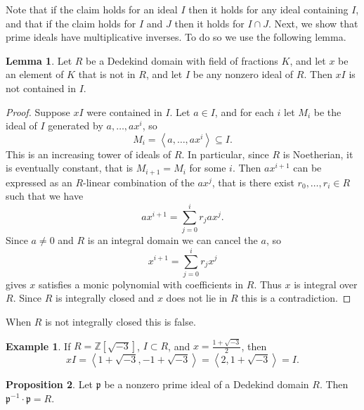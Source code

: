 \documentclass{article}
\newcommand{\Z}{\mathbb{Z}}
\renewcommand{\sb}[1]{\left[ #1 \right]}
\newcommand{\ab}[1]{\left\langle #1 \right\rangle}
\theoremstyle{definition}\newtheorem{definition}{Definition}[subsection]
\theoremstyle{definition}\newtheorem{remark}[definition]{Remark}
\theoremstyle{definition}\newtheorem*{example}{Example}
\theoremstyle{definition}\newtheorem*{note}{Note}
\newtheorem{proposition}[definition]{Proposition}
\newtheorem{lemma}[definition]{Lemma}
\begin{document}
Note that if the claim holds for an ideal $ I $ then it holds for any ideal containing $ I $, and that if the claim holds for $ I $ and $ J $ then it holds for $ I \cap J $. Next, we show that prime ideals have multiplicative inverses. To do so we use the following lemma.

\begin{lemma}
\label{lem:11.1.7}
Let $ R $ be a Dedekind domain with field of fractions $ K $, and let $ x $ be an element of $ K $ that is not in $ R $, and let $ I $ be any nonzero ideal of $ R $. Then $ xI $ is not contained in $ I $.
\end{lemma}

\begin{proof}
Suppose $ xI $ were contained in $ I $. Let $ a \in I $, and for each $ i $ let $ M_i $ be the ideal of $ I $ generated by $ a, \dots, ax^i $, so
$$ M_i = \ab{a, \dots, ax^i} \subseteq I. $$
This is an increasing tower of ideals of $ R $. In particular, since $ R $ is Noetherian, it is eventually constant, that is $ M_{i + 1} = M_i $ for some $ i $. Then $ ax^{i + 1} $ can be expressed as an $ R $-linear combination of the $ ax^j $, that is there exist $ r_0, \dots, r_i \in R $ such that we have
$$ ax^{i + 1} = \sum_{j = 0}^i r_jax^j. $$
Since $ a \ne 0 $ and $ R $ is an integral domain we can cancel the $ a $, so
$$ x^{i + 1} = \sum_{j = 0}^i r_jx^j $$
gives $ x $ satisfies a monic polynomial with coefficients in $ R $. Thus $ x $ is integral over $ R $. Since $ R $ is integrally closed and $ x $ does not lie in $ R $ this is a contradiction.
\end{proof}

When $ R $ is not integrally closed this is false.

\begin{example}
If $ R = \Z\sb{\sqrt{-3}} $, $ I \subset R $, and $ x = \tfrac{1 + \sqrt{-3}}{2} $, then
$$ xI = \ab{1 + \sqrt{-3}, -1 + \sqrt{-3}} = \ab{2, 1 + \sqrt{-3}} = I. $$
\end{example}

\begin{proposition}
\label{prop:11.1.8}
Let $ \mathfrak{p} $ be a nonzero prime ideal of a Dedekind domain $ R $. Then $ \mathfrak{p}^{-1} \cdot \mathfrak{p} = R $.
\end{proposition}
\end{document}
